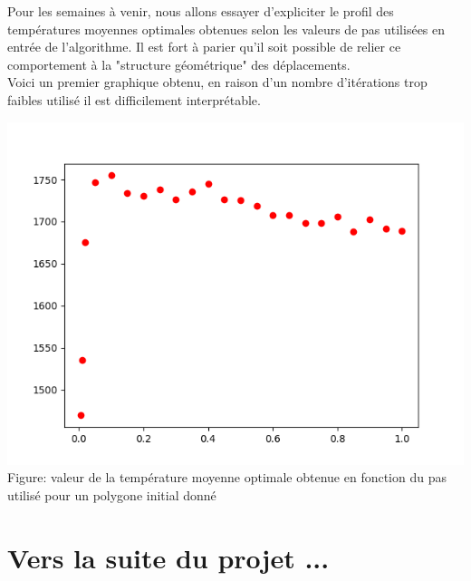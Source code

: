 \documentclass[a4paper,reqno]{article}
\newcommand{\pa}{\hspace{0.5cm}}
\begin{document}
Pour les semaines à venir, nous allons essayer d'expliciter le profil des températures moyennes optimales obtenues selon les valeurs de pas utilisées en entrée de l'algorithme. Il est fort à parier qu'il soit possible de relier ce comportement à la "structure géométrique" des déplacements.
\\ Voici un premier graphique obtenu, en raison d'un nombre d'itérations trop faibles utilisé il est difficilement interprétable.
\begin{center}
\includegraphics[scale=0.5]{plotPas.png}
\\ Figure: valeur de la température moyenne optimale obtenue en fonction du pas utilisé pour un polygone initial donné
\end{center}


\newpage
\part{Vers la suite du projet ...}
\pa 
\end{document}

